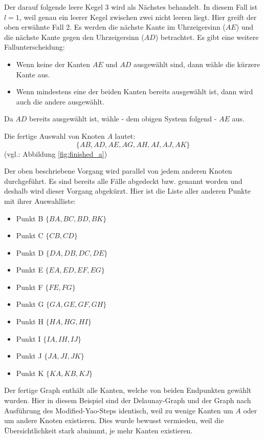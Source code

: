 \documentclass[a4paper,twoside]{IEEEtran}
\begin{document}
Der darauf folgende leere Kegel $3 $ wird als Nächstes behandelt.
In diesem Fall ist $l=1 $, weil genau ein leerer Kegel zwischen zwei nicht leeren liegt.
Hier greift der oben erwähnte Fall 2.
Es werden die nächste Kante im Uhrzeigersinn ($AE $) und die nächste Kante gegen den Uhrzeigersinn ($AD $) betrachtet.
Es gibt eine weitere Fallunterscheidung:
\begin{itemize}
\item Wenn keine der Kanten $AE $ und $AD $ ausgewählt sind, dann wähle die kürzere Kante aus.
\item Wenn mindestens eine der beiden Kanten bereits ausgewählt ist, dann wird auch die andere ausgewählt.
\end{itemize}
Da $AD $ bereits ausgewählt ist, wähle - dem obigen System folgend - $AE $ aus.

Die fertige Auswahl von Knoten $A $ lautet:
\begin{equation*}
\{AB, AD, AE, AG, AH, AI, AJ, AK\}
\end{equation*}
(vgl.: Abbildung \ref{fig:finished_a})


Der oben beschriebene Vorgang wird parallel von jedem anderen Knoten durchgeführt.
Es sind bereits alle Fälle abgedeckt bzw. genannt worden und deshalb wird dieser Vorgang abgekürzt.
Hier ist die Liste aller anderen Punkte mit ihrer Auswahlliste:
\begin{itemize}
\item Punkt B $\{BA, BC, BD, BK\}$
\item Punkt C $\{CB, CD\}$
\item Punkt D $\{DA, DB, DC, DE\}$
\item Punkt E $\{EA, ED, EF, EG\}$
\item Punkt F $\{FE, FG\}$
\item Punkt G $\{GA, GE, GF, GH\}$
\item Punkt H $\{HA, HG, HI\}$
\item Punkt I $\{IA, IH, IJ\}$
\item Punkt J $\{JA, JI, JK\}$
\item Punkt K $\{KA, KB, KJ\}$
\end{itemize}

Der fertige Graph enthält alle Kanten, welche von beiden Endpunkten gewählt wurden.
Hier in diesem Beispiel sind der Delaunay-Graph und der Graph nach Ausführung des Modified-Yao-Steps identisch, weil zu wenige Kanten um $A $ oder um andere Knoten existieren.
Dies wurde bewusst vermieden, weil die Übersichtlichkeit stark abnimmt, je mehr Kanten existieren.
\end{document}
